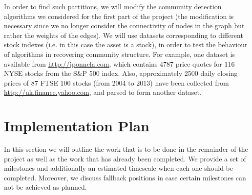 \documentclass[12pt]{article}
\numberwithin{equation}{section}
\begin{document}
In order to find such partitions, we will modify the community detection algorithms we considered for the first part of the project (the modification is necessary since we no longer consider the connectivity of nodes in the graph but rather the weights of the edges). We will use datasets corresponding to different stock indexes (i.e. in this case the asset is a stock), in order to test the behaviour of algorithms in recovering community structure. For example, one dataset is available from \url{http://jponnela.com}, which contains 4787 price quotes for 116 NYSE stocks from the S\&P 500 index. Also, approximately 2500 daily closing prices of 87 FTSE 100 stocks (from 2004 to 2013) have been collected from \url{http://uk.finance.yahoo.com}, and parsed to form another dataset.


\newpage
\thispagestyle{plain}
\mbox{}
\section {Implementation Plan}
\label{sec:implementationPlan}

In this section we will outline the work that is to be done in the remainder of the project as well as the work that has already been completed. We provide a set of milestones and additionally an estimated timescale when each one should be completed. Moreover, we discuss fallback positions in case certain milestones can not be achieved as planned.
\end{document}
